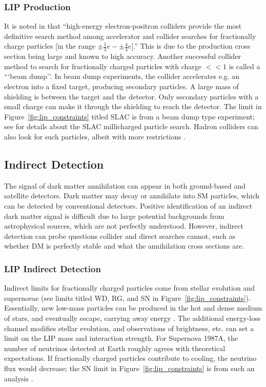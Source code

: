 \subsubsection{LIP Production}
It is noted in \cite{Perl2009} that ``high-energy electron-positron colliders provide the most definitive search method among accelerator and collider searches for fractionally charge particles [in the range $\pm\frac{1}{3}e -\pm \frac{4}{3}e$].'' This is due to the production cross section being large and known to high accuracy. Another successful collider method to search for fractionally charged particles with charge $<<1$ is called a ```beam dump''. In beam dump experiments, the collider accelerates e.g. an electron into a fixed target, producing secondary particles. A large mass of shielding is between the target and the detector. Only secondary particles with a small charge can make it through the shielding to reach the detector. The limit in Figure~\ref{fig:lip_constraints} titled SLAC is from a beam dump type experiment; see \cite{Prinz1998} for details about the SLAC millicharged particle search. Hadron colliders can also look for such particles, albeit with more restrictions \cite{Perl2009}. 

\subsection{Indirect Detection}
The signal of dark matter annihilation can appear in both ground-based and satellite detectors. Dark matter may decay or annihilate into \ac{SM} particles, which can be detected by conventional detectors. Positive identification of an indirect dark matter signal is difficult due to large potential backgrounds from astrophysical sources, which are not perfectly understood. However, indirect detection can probe questions collider and direct searches cannot, such as whether \ac{DM} is perfectly stable and what the annihilation cross sections are. 

\subsubsection{LIP Indirect Detection}
Indirect limits for fractionally charged particles come from stellar evolution and supernovae (see limits titled WD, RG, and SN in Figure~\ref{fig:lip_constraints}). Essentially, new low-mass particles can be produced in the hot and dense medium of stars, and eventually escape, carrying away energy \cite{Davidson2000}. The additional energy-loss channel modifies stellar evolution, and observations of brightness, etc. can set a limit on the \ac{LIP} mass and interaction strength. For Supernova 1987A, the number of neutrinos detected at Earth roughly agrees with theoretical expectations. If fractionally charged particles contribute to cooling, the neutrino flux would decrease; the SN limit in Figure~\ref{fig:lip_constraints} is from such an analysis \cite{Perl2009} \cite{Davidson2000}.

